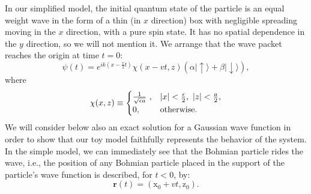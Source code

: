 \documentclass[12pt,preprint,tightenlines]{elsarticle}
\begin{document}
In our simplified model, the initial quantum state of the particle
is an equal weight wave in the form of a thin (in $x$ direction)
box with negligible spreading moving in the $x$ direction, with a
pure spin state. It has no spatial dependence in the $y$ direction,
so we will not mention it. We arrange that the wave packet reaches
the origin at time $t=0$:
\begin{equation}
\psi(t)=e^{ik(x-\frac{v}{2}t)}\chi(x-vt,z)(\alpha|\uparrow\rangle+\beta|\downarrow\rangle),\label{psiin}
\end{equation}
 where
 \begin{equation}
\chi(x,z)\equiv\begin{cases}
\frac{1}{{\sqrt{\epsilon a}}}~, & |x|<\frac{\epsilon}{2},~|z|<\frac{a}{2},\\
0, & {\rm otherwise}.\end{cases}\label{chi}
\end{equation}
 We will consider below also an exact solution for a Gaussian wave
function in order to show that our toy model faithfully represents
the behavior of the system. In the simple model, we can immediately
see that the Bohmian particle rides the wave, i.e., the position of
any Bohmian particle placed in the support of the particle's wave
function is described, for $t<0$, by:
\begin{equation}
\mathbf{r}(t)=(\mathrm{x}_{0}+vt,\mathrm{z}_{0}).
\end{equation}
\end{document}
